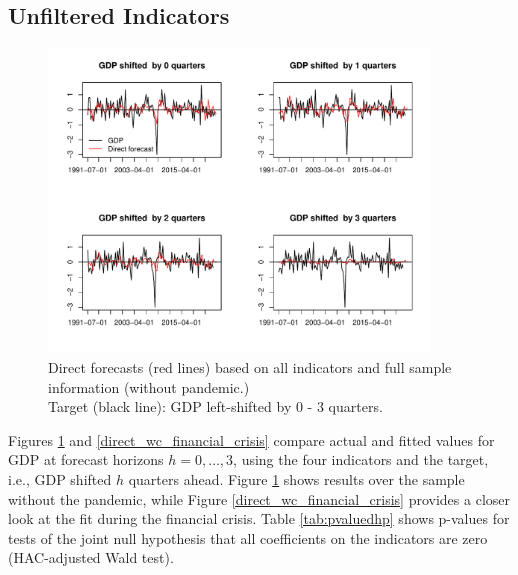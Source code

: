 \documentclass[11pt,a4paper]{article}
\begin{document}
\subsection{Unfiltered Indicators}\label{cdf}


\begin{figure}[H]
    \begin{center}
        \includegraphics[width=0.9\textwidth]{./Figures/direct_wc_all.pdf}
        \caption{Direct forecasts (red lines) based on all indicators and full sample information (without pandemic.)\\
        Target (black line): GDP left-shifted  by 0 - 3 quarters.
        \label{direct_wc}}
    \end{center}
\end{figure}

Figures \ref{direct_wc} and \ref{direct_wc_financial_crisis} compare actual and fitted values for GDP at forecast horizons $h = 0, \ldots, 3$, using the four indicators and the target, i.e., GDP shifted $h$ quarters ahead. Figure \ref{direct_wc} shows results over the sample without the pandemic, while Figure \ref{direct_wc_financial_crisis} provides a closer look at the fit during the financial crisis. Table \ref{tab:pvaluedhp} shows p-values for tests of the joint null hypothesis that all coefficients on the indicators are zero (HAC-adjusted Wald test).
\end{document}
